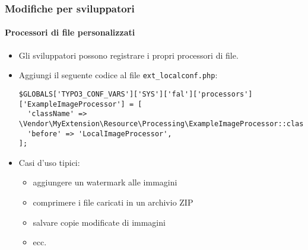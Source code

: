 \begin{frame}[fragile]
	\frametitle{Modifiche per sviluppatori}
	\framesubtitle{Processori di file personalizzati}

	\lstset{basicstyle=\tiny\ttfamily}

	\begin{itemize}
		\item Gli sviluppatori possono registrare i propri processori di file.
		\item Aggiungi il seguente codice al file \texttt{ext\_localconf.php}:

\begin{lstlisting}
$GLOBALS['TYPO3_CONF_VARS']['SYS']['fal']['processors']['ExampleImageProcessor'] = [
  'className' => \Vendor\MyExtension\Resource\Processing\ExampleImageProcessor::class,
  'before' => 'LocalImageProcessor',
];
\end{lstlisting}

		\item Casi d'uso tipici:

			\begin{itemize}
				\item aggiungere un watermark alle immagini
				\item comprimere i file caricati in un archivio ZIP
				\item salvare copie modificate di immagini
				\item ecc.
			\end{itemize}

	\end{itemize}

\end{frame}


